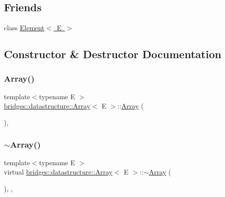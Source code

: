 \subsection*{Friends}
\begin{DoxyCompactItemize}
\item 
class \mbox{\hyperlink{classbridges_1_1datastructure_1_1_array_a8c6ff2a8dd3e27346dd25f588a78828a}{Element$<$ E $>$}}
\end{DoxyCompactItemize}


\subsection{Constructor \& Destructor Documentation}
\mbox{\label{classbridges_1_1datastructure_1_1_array_a23cb659c4f39e5e6f3b29a58e97b8e0d}} 
\subsubsection{\texorpdfstring{Array()}{Array()}\hspace{0.1cm}{\footnotesize\ttfamily [1/3]}}
{\footnotesize\ttfamily template$<$typename E $>$ \\
\mbox{\hyperlink{classbridges_1_1datastructure_1_1_array}{bridges\+::datastructure\+::\+Array}}$<$ E $>$\+::\mbox{\hyperlink{classbridges_1_1datastructure_1_1_array}{Array}} (\begin{DoxyParamCaption}{ }\end{DoxyParamCaption})\hspace{0.3cm}{\ttfamily [inline]}, {\ttfamily [protected]}}

\mbox{\label{classbridges_1_1datastructure_1_1_array_a5a9f212f560e9673259eece27d8f11cc}} 
\subsubsection{\texorpdfstring{$\sim$Array()}{~Array()}}
{\footnotesize\ttfamily template$<$typename E $>$ \\
virtual \mbox{\hyperlink{classbridges_1_1datastructure_1_1_array}{bridges\+::datastructure\+::\+Array}}$<$ E $>$\+::$\sim$\mbox{\hyperlink{classbridges_1_1datastructure_1_1_array}{Array}} (\begin{DoxyParamCaption}{ }\end{DoxyParamCaption})\hspace{0.3cm}{\ttfamily [inline]}, {\ttfamily [protected]}, {\ttfamily [virtual]}}

